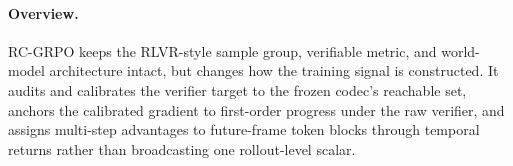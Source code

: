 \documentclass[letterpaper]{article} %
\begin{document}

\paragraph{Overview.}
RC-GRPO keeps the RLVR-style sample group, verifiable metric, and world-model architecture intact, but changes how the training signal is constructed. It audits and calibrates the verifier target to the frozen codec's reachable set, anchors the calibrated gradient to first-order progress under the raw verifier, and assigns multi-step advantages to future-frame token blocks through temporal returns rather than broadcasting one rollout-level scalar.
\end{document}
